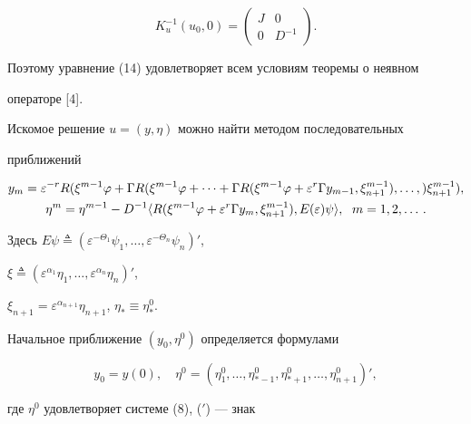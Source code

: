 $$


K_u^{-1}(u_0,0) =


\begin{pmatrix}


J & 0 \\


0 & D^{-1}


\end{pmatrix}.


$$


Поэтому уравнение (14) удовлетворяет всем условиям теоремы о неявном


операторе [4].





Искомое решение $u = (y,\eta)$ можно найти методом последовательных


приближений


\begin{gather}


y_m = \varepsilon^{-r}R(\xi^{m-1}\varphi + \Gamma R(\xi^{m-1}\varphi +


\dotsb + \Gamma R(\xi^{m-1}\varphi + \varepsilon^r\Gamma y_{m-1},


\xi^{m-1}_{n+1}),\dotsc,) \xi^{m-1}_{n+1}),\\


%


\eta^m = \eta^{m-1} - D^{-1}\la R(\xi^{m-1}\varphi + \varepsilon^r\Gamma y_m,


\xi^{m-1}_{n+1}),E(\varepsilon)\psi\ra,\ \; m=1,2,\dotsc.


\end{gather}


Здесь $E\psi \triangleq(\varepsilon^{-


\Theta_1}\psi_1,\dotsc,\varepsilon^{-\Theta_n}\psi_n)'$,


$\xi\triangleq(\varepsilon^{\alpha_1}\eta_1,\dotsc,\varepsilon^{\alpha_n}


\eta_n)'$,


$\xi_{n+1} = \varepsilon^{\alpha_{n+1}}\eta_{n+1}$, $\eta_* \equiv


\eta^0_*$.


Начальное приближение $(y_0,\eta^0)$ определяется формулами


$$


y_0 = y(0), \quad \eta^0 = (\eta^0_1,\dotsc,\eta^0_{*-


1},\eta^0_{*+1},\dotsc,\eta^0_{n+1})',


$$


где $\eta^0$ удовлетворяет системе (8), ($'$) --- знак


